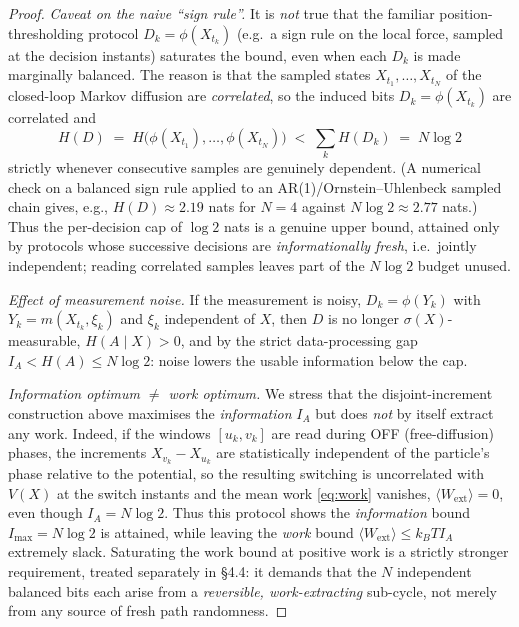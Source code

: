 \documentclass{amsart}
\theoremstyle{definition}
\newcommand{\kB}{k_{B}}
\newcommand{\Wext}{\langle W_{\mathrm{ext}}\rangle}
\begin{document}
\begin{proof}
\emph{Caveat on the naive ``sign rule''.} It is \emph{not} true that the
familiar position-thresholding protocol $D_k=\phi(X_{t_k})$ (e.g.\ a sign rule
on the local force, sampled at the decision instants) saturates the bound, even
when each $D_k$ is made marginally balanced. The reason is that the sampled
states $X_{t_1},\dots,X_{t_N}$ of the closed-loop Markov diffusion are
\emph{correlated}, so the induced bits $D_k=\phi(X_{t_k})$ are correlated and
\[
H(D)\;=\;H\bigl(\phi(X_{t_1}),\dots,\phi(X_{t_N})\bigr)\;<\;\sum_k H(D_k)\;=\;N\log2
\]
strictly whenever consecutive samples are genuinely dependent. (A numerical
check on a balanced sign rule applied to an AR(1)/Ornstein--Uhlenbeck sampled
chain gives, e.g., $H(D)\approx 2.19$ nats for $N=4$ against $N\log2\approx2.77$
nats.) Thus the per-decision cap of $\log2$ nats is a genuine upper bound,
attained only by protocols whose successive decisions are \emph{informationally
fresh}, i.e.\ jointly independent; reading correlated samples leaves part of the
$N\log2$ budget unused.

\emph{Effect of measurement noise.} If the measurement is noisy,
$D_k=\phi(Y_k)$ with $Y_k=m(X_{t_k},\xi_k)$ and $\xi_k$ independent of $X$, then
$D$ is no longer $\sigma(X)$-measurable, $H(A\mid X)>0$, and by the strict
data-processing gap $I_A<H(A)\le N\log2$: noise lowers the usable information
below the cap.

\emph{Information optimum $\ne$ work optimum.} We stress that the
disjoint-increment construction above maximises the \emph{information} $I_A$
but does \emph{not} by itself extract any work. Indeed, if the windows
$[u_k,v_k]$ are read during OFF (free-diffusion) phases, the increments
$X_{v_k}-X_{u_k}$ are statistically independent of the particle's phase
relative to the potential, so the resulting switching is uncorrelated with
$V(X)$ at the switch instants and the mean work \eqref{eq:work} vanishes,
$\Wext=0$, even though $I_A=N\log2$. Thus this protocol shows the
\emph{information} bound $I_{\max}=N\log2$ is attained, while leaving the
\emph{work} bound $\Wext\le\kB T I_A$ extremely slack. Saturating the work
bound at positive work is a strictly stronger requirement, treated separately
in \S4.4: it demands that the $N$ independent balanced bits each arise from a
\emph{reversible, work-extracting} sub-cycle, not merely from any source of
fresh path randomness.
\end{proof}
\end{document}
